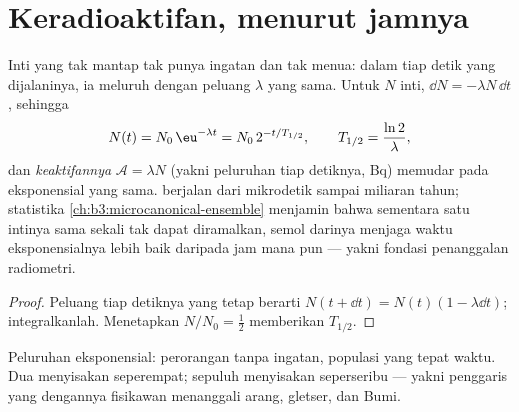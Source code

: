 \section{Keradioaktifan, menurut jamnya}

\begin{theorem}\label{thm:b3:nuclear-physics:decay}
Inti yang tak mantap tak punya ingatan dan tak menua: dalam tiap detik
yang dijalaninya, ia meluruh dengan peluang $\lambda$ yang sama. Untuk $N$
inti, $\dd N = -\lambda N\,\dd t$, sehingga
\[
N(t) = N_0\,\eu^{-\lambda t} = N_0\,2^{-t/T_{1/2}} ,
\qquad T_{1/2} = \frac{\ln2}{\lambda} ,
\]
dan \emph{keaktifannya} $\mathcal A = \lambda N$ (yakni peluruhan tiap
detiknya, \unit{Bq}) memudar pada eksponensial yang sama.  berjalan
dari mikrodetik sampai miliaran tahun; statistika
\cref{ch:b3:microcanonical-ensemble} menjamin bahwa sementara satu
intinya sama sekali tak dapat diramalkan, semol darinya menjaga waktu
eksponensialnya lebih baik daripada jam mana pun --- yakni fondasi
penanggalan radiometri.
\end{theorem}

\begin{proof}
Peluang tiap detiknya yang tetap berarti $N(t + \dd t) = N(t)(1 -
\lambda\dd t)$; integralkanlah. Menetapkan $N/N_0 = \tfrac12$ memberikan
$T_{1/2}$.
\end{proof}

\begin{omfigure}

{\small Peluruhan eksponensial: perorangan tanpa ingatan, populasi yang
tepat waktu. Dua  menyisakan seperempat; sepuluh menyisakan
seperseribu --- yakni penggaris yang dengannya fisikawan menanggali arang,
gletser, dan Bumi.}
\end{omfigure}

